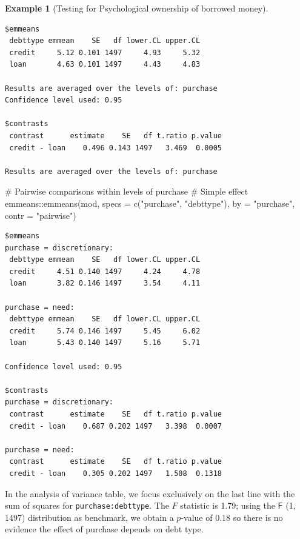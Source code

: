 \documentclass[
  11pt,
  letterpaper,
]{scrbook}
\newenvironment{Shaded}{\begin{snugshade}}{\end{snugshade}}
\newcommand{\AttributeTok}[1]{\textcolor[rgb]{0.40,0.45,0.13}{#1}}
\newcommand{\CommentTok}[1]{\textcolor[rgb]{0.37,0.37,0.37}{#1}}
\newcommand{\FunctionTok}[1]{\textcolor[rgb]{0.28,0.35,0.67}{#1}}
\newcommand{\NormalTok}[1]{\textcolor[rgb]{0.00,0.23,0.31}{#1}}
\newcommand{\SpecialCharTok}[1]{\textcolor[rgb]{0.37,0.37,0.37}{#1}}
\newcommand{\StringTok}[1]{\textcolor[rgb]{0.13,0.47,0.30}{#1}}
\theoremstyle{definition}
\newtheorem{example}{Example}[chapter]
\theoremstyle{remark}
\begin{document}
\begin{example}[Testing for Psychological ownership of borrowed
money]
\begin{verbatim}
$emmeans
 debttype emmean    SE   df lower.CL upper.CL
 credit     5.12 0.101 1497     4.93     5.32
 loan       4.63 0.101 1497     4.43     4.83

Results are averaged over the levels of: purchase 
Confidence level used: 0.95 

$contrasts
 contrast      estimate    SE   df t.ratio p.value
 credit - loan    0.496 0.143 1497   3.469  0.0005

Results are averaged over the levels of: purchase 
\end{verbatim}

\begin{Shaded}
\begin{Highlighting}[]
\CommentTok{\# Pairwise comparisons within levels of purchase}
\CommentTok{\# Simple effect}
\NormalTok{emmeans}\SpecialCharTok{::}\FunctionTok{emmeans}\NormalTok{(mod, }
                 \AttributeTok{specs =} \FunctionTok{c}\NormalTok{(}\StringTok{"purchase"}\NormalTok{, }\StringTok{"debttype"}\NormalTok{),}
                 \AttributeTok{by =} \StringTok{"purchase"}\NormalTok{,}
                 \AttributeTok{contr =} \StringTok{"pairwise"}\NormalTok{)}
\end{Highlighting}
\end{Shaded}

\begin{verbatim}
$emmeans
purchase = discretionary:
 debttype emmean    SE   df lower.CL upper.CL
 credit     4.51 0.140 1497     4.24     4.78
 loan       3.82 0.146 1497     3.54     4.11

purchase = need:
 debttype emmean    SE   df lower.CL upper.CL
 credit     5.74 0.146 1497     5.45     6.02
 loan       5.43 0.140 1497     5.16     5.71

Confidence level used: 0.95 

$contrasts
purchase = discretionary:
 contrast      estimate    SE   df t.ratio p.value
 credit - loan    0.687 0.202 1497   3.398  0.0007

purchase = need:
 contrast      estimate    SE   df t.ratio p.value
 credit - loan    0.305 0.202 1497   1.508  0.1318
\end{verbatim}

In the analysis of variance table, we focus exclusively on the last line
with the sum of squares for \texttt{purchase:debttype}. The \(F\)
statistic is 1.79; using the \(\mathsf{F}\) (1, 1497) distribution as
benchmark, we obtain a \(p\)-value of 0.18 so there is no evidence the
effect of purchase depends on debt type.


\end{example}
\end{document}
